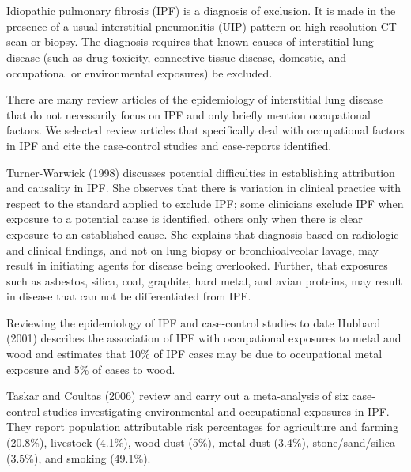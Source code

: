 \documentclass[a4paper,10pt]{article}
\author{Carl Reynolds and Kristin Cummings\\}
\date{}
\begin{document}

\maketitle






\section*{}


Idiopathic pulmonary fibrosis (IPF) is a diagnosis of exclusion. It is made in the presence of a usual interstitial pneumonitis (UIP) pattern on high resolution CT scan or biopsy. The diagnosis requires that known causes of interstitial lung disease (such as drug toxicity, connective tissue disease, domestic, and occupational or environmental exposures) be excluded.\cite{Travis2013}

There are many review articles of the epidemiology of interstitial lung disease that do not necessarily focus on IPF and only briefly mention occupational factors. We selected review articles that specifically deal with occupational factors in IPF and cite the case-control studies and case-reports identified.

Turner-Warwick (1998) discusses potential difficulties in establishing attribution and causality in IPF. She observes that there is variation in clinical practice with respect to the standard applied to exclude IPF; some clinicians exclude IPF when exposure to a potential cause is identified, others only when there is clear exposure to an established cause. She explains that diagnosis based on radiologic and clinical findings, and not on lung biopsy or bronchioalveolar lavage, may result in initiating agents for disease being overlooked. Further, that exposures such as asbestos, silica, coal,
graphite, hard metal, and avian proteins, may result in disease that can not be differentiated from IPF.\cite{Turner-Warwick1998}

Reviewing the epidemiology of IPF and case-control studies to date Hubbard (2001) describes the association of IPF with occupational exposures to metal and wood and estimates that 10\% of IPF cases may be due to occupational metal exposure and 5\% of cases to wood.\cite{Hubbard2001}

Taskar and Coultas (2006) review and carry out a meta-analysis of six case-control studies investigating environmental and occupational exposures in IPF. They report population attributable risk percentages for agriculture and farming (20.8\%), livestock (4.1\%), wood dust (5\%), metal dust (3.4\%), stone/sand/silica (3.5\%), and smoking (49.1\%).\cite{Taskar2006}
\end{document}

